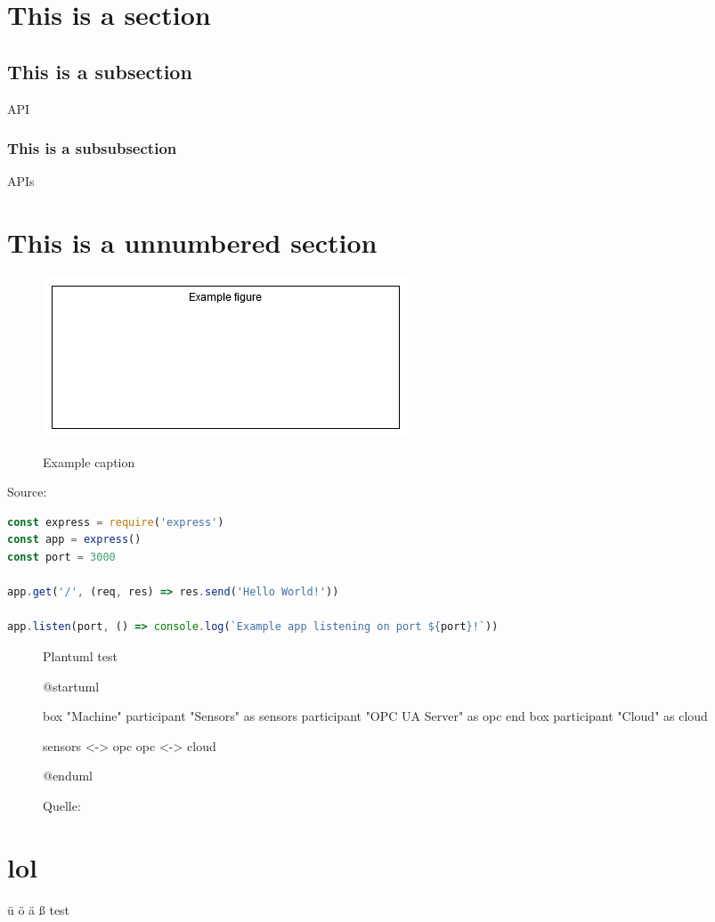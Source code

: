 \documentclass[%
    debug           = true,
    auto-generate   = true,
    print-ndn       = true
]{udhbwvst}
\begin{document}
\section{This is a section}
\blindtext {}
\subsection{This is a subsection}
\blindtext \ac{API}
\subsubsection{This is a subsubsection}
\blindtext \acp{API}
\section*{This is a unnumbered section}

\begin{figure}[ht] 
    \centering
    \caption{Example caption}
    \includegraphics[width=\textwidth]{assets/figure.png} 
    \label{fig:goodreference}
\end{figure}

\blindtext

\begin{subcaptionenv}{Source: }
    \begin{lstlisting}[caption={Express Example}, language=javascript]
const express = require('express')
const app = express()
const port = 3000

app.get('/', (req, res) => res.send('Hello World!'))

app.listen(port, () => console.log(`Example app listening on port ${port}!`))
    \end{lstlisting}
\end{subcaptionenv}

\blindtext

\begin{figure}[h]
    \centering
    \caption{Plantuml test}
    \begin{plantuml}
        @startuml

        box "Machine"
            participant "Sensors" as sensors
            participant "OPC UA Server" as opc
        end box
        participant "Cloud" as cloud

        sensors <-> opc
        opc <-> cloud

        @enduml    
    \end{plantuml}
    \caption*{\footnotesize{Quelle: }}
    \label{fig:plantuml_test}
\end{figure}

\section{lol}

ü ö ä ß test
\end{document}
